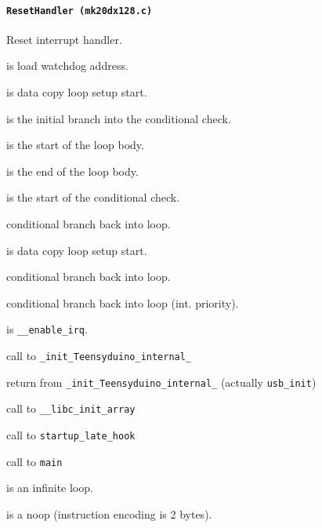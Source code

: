 \paragraph{\texttt{ResetHandler (mk20dx128.c)}} Reset interrupt handler.

 is load watchdog address.

\vspace{1em}

 is data copy loop setup start.

 is the initial branch into the conditional check.

 is the start of the loop body.

 is the end of the loop body.

 is the start of the conditional check.

 conditional branch back into loop.

\vspace{1em}

 is data copy loop setup start.

 conditional branch back into loop.

\vspace{1em}

 conditional branch back into loop (int. priority).

\vspace{1em}

 is \texttt{\_\_enable\_irq}.

 call to \texttt{\_init\_Teensyduino\_internal\_}

 return from \texttt{\_init\_Teensyduino\_internal\_} (actually \texttt{usb\_init})

 call to \texttt{\_\_libc\_init\_array}

 call to \texttt{startup\_late\_hook}

 call to \texttt{main}

 is an infinite loop.

 is a noop (instruction encoding is 2 bytes).

\vspace{1em}

